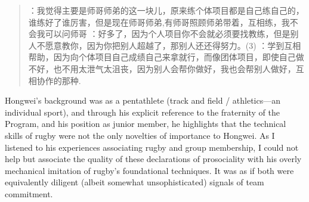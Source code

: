 \begin{CJK}{UTF8}{gbsn}
  \begin{quotation}
    ：我觉得主要是师哥师弟的这一块儿，原来练个体项目都是自己练自己的，谁练好了谁厉害，但是现在师哥师弟,有师哥照顾师弟带着，互相练，我不会我可以问师哥
    ：好多了，因为个人项目你不会就必须要找教练，但是别人不愿意教你，因为你把别人超越了，那别人还还得努力。(3) ：学到互相帮助，因为向个体项目自己成绩自己来拿就行，而像团体项目，即使自己做不好，也不用太泄气太沮丧，因为别人会帮你做好，我也会帮别人做好，互相协作的那种.
  \end{quotation}
\end{CJK}

Hongwei’s background was as a pentathlete (track and field / athletics---an individual sport), and through his explicit reference to the fraternity of the Program, and his position as junior member, he highlights that the technical skills of rugby were not the only novelties of importance to Hongwei. As I listened to his experiences associating rugby and group membership, I could not help but associate the quality of these declarations of prosociality with his overly mechanical imitation of rugby's foundational techniques.  It was as if both were equivalently diligent (albeit somewhat unsophisticated) signals of team commitment.

